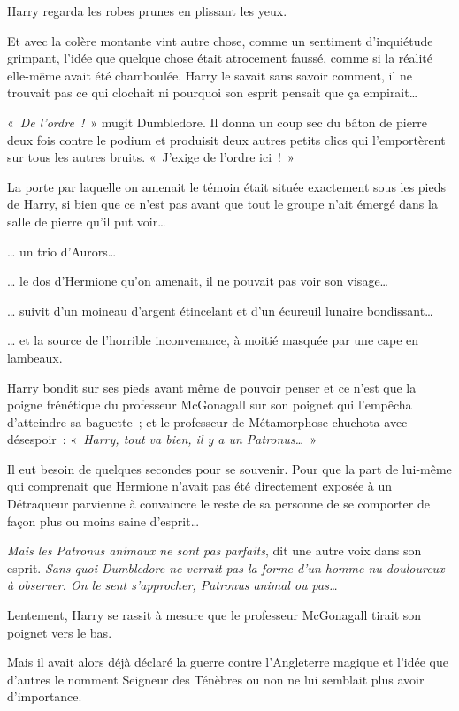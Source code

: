 Harry regarda les robes prunes en plissant les yeux.

Et avec la colère montante vint autre chose, comme un sentiment d'inquiétude grimpant, l'idée que quelque chose était atrocement faussé, comme si la réalité elle-même avait été chamboulée. Harry le savait sans savoir comment, il ne trouvait pas ce qui clochait ni pourquoi son esprit pensait que ça empirait…

«~\emph{De l'ordre~!}~» mugit Dumbledore. Il donna un coup sec du bâton de pierre deux fois contre le podium et produisit deux autres petits clics qui l'emportèrent sur tous les autres bruits. «~J'exige de l'ordre ici~!~»

La porte par laquelle on amenait le témoin était située exactement sous les pieds de Harry, si bien que ce n'est pas avant que tout le groupe n'ait émergé dans la salle de pierre qu'il put voir…

… un trio d'Aurors…

… le dos d'Hermione qu'on amenait, il ne pouvait pas voir son visage…

… suivit d'un moineau d'argent étincelant et d'un écureuil lunaire bondissant…

… et la source de l'horrible inconvenance, à moitié masquée par une cape en lambeaux.

Harry bondit sur ses pieds avant même de pouvoir penser et ce n'est que la poigne frénétique du professeur McGonagall sur son poignet qui l'empêcha d'atteindre sa baguette~; et le professeur de Métamorphose chuchota avec désespoir~: «~\emph{Harry, tout va bien, il y a un Patronus…}~»

Il eut besoin de quelques secondes pour se souvenir. Pour que la part de lui-même qui comprenait que Hermione n'avait pas été directement exposée à un Détraqueur parvienne à convaincre le reste de sa personne de se comporter de façon plus ou moins saine d'esprit…

\emph{Mais les Patronus animaux ne sont pas parfaits}, dit une autre voix dans son esprit. \emph{Sans quoi Dumbledore ne verrait pas la forme d'un homme nu douloureux à observer. On le sent s'approcher, Patronus animal ou pas…}

Lentement, Harry se rassit à mesure que le professeur McGonagall tirait son poignet vers le bas.

Mais il avait alors déjà déclaré la guerre contre l'Angleterre magique et l'idée que d'autres le nomment Seigneur des Ténèbres ou non ne lui semblait plus avoir d'importance.

